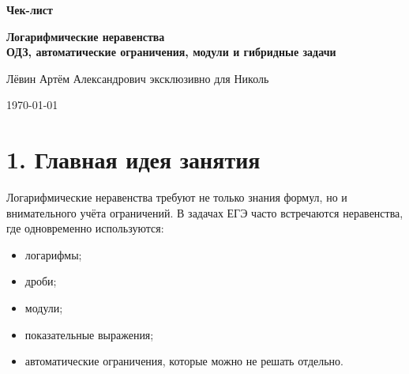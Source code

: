 \documentclass[a4paper,12pt]{article}
\newcommand{\sectionline}{\vspace{0.35em}{\color{accent}\hrule height 0.6pt}\vspace{0.65em}}
\begin{document}
\begin{titlepage}
\thispagestyle{empty}
\begin{center}
\vspace*{2.5cm}

{\Large \textcolor{accent}{\textbf{Чек-лист}}}

\vspace{0.7cm}

{\huge \textbf{Логарифмические неравенства}}\\[0.25cm]
{\Large \textbf{ОДЗ, автоматические ограничения, модули и гибридные задачи}}

\vspace{1.3cm}

{\large Лёвин Артём Александрович эксклюзивно для Николь}

\vspace{0.6cm}

{\large \today}

\vfill


\vspace*{1.2cm}
\end{center}
\end{titlepage}

\section*{\textcolor{darkaccent}{1. Главная идея занятия}}
\sectionline

Логарифмические неравенства требуют не только знания формул, но и внимательного учёта ограничений. В задачах ЕГЭ часто встречаются неравенства, где одновременно используются:

\begin{itemize}
    \item логарифмы;
    \item дроби;
    \item модули;
    \item показательные выражения;
    \item автоматические ограничения, которые можно не решать отдельно.
\end{itemize}
\end{document}
